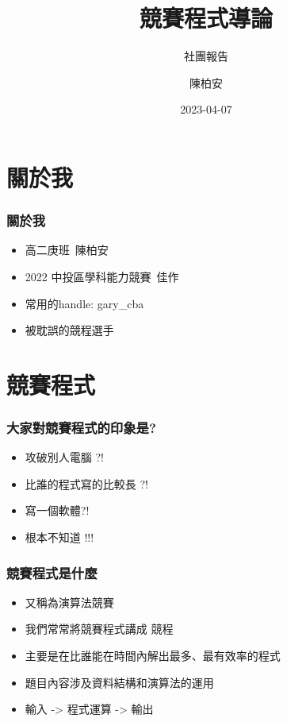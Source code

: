 \documentclass[mathserif]{beamer}
\title{競賽程式導論}
\author{陳柏安}
\subtitle{社團報告}
\date{2023-04-07}
\begin{document}
    \frame{\titlepage}

    \begin {frame}
        \tableofcontents 
    \end {frame}

        \section{關於我}

    \begin {frame}
    \frametitle{關於我}
        \begin {itemize}
        \item 高二庚班\ 陳柏安
        \item 2022 中投區學科能力競賽\ 佳作
        \item 常用的handle: gary\_cba
        \item 被耽誤的競程選手
        \end {itemize}
    \end {frame}

        \section{競賽程式}
        
    \begin {frame}
        \frametitle{大家對競賽程式的印象是?}
        \begin {itemize}
            \item 攻破別人電腦 ?!
            \pause
            \item 比誰的程式寫的比較長 ?!
            \pause
            \item 寫一個軟體?!
            \pause 
            \item 根本不知道 !!!
            \pause
        \end {itemize}
    \end{frame}

    \begin{frame}
        \frametitle{競賽程式是什麼}
        \begin{itemize}
            \item 又稱為演算法競賽
            \pause
            \item 我們常常將競賽程式講成 競程
            \pause
            \item 主要是在比誰能在時間內解出最多、最有效率的程式
            \pause
            \item 題目內容涉及資料結構和演算法的運用
            \pause
            \item 輸入 -> 程式運算 -> 輸出
        \end{itemize}
    \end{frame}
\end{document}

